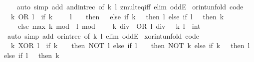 \begin{isabellebody}
%
\isadelimproof
\ \ %
\endisadelimproof
%
\isatagproof
{}\isamarkupfalse%
\ {\isacharparenleft}{\kern0pt}auto\ simp\ add{\isacharcolon}{\kern0pt}\ and{\isacharunderscore}{\kern0pt}int{\isacharunderscore}{\kern0pt}rec\ {\isacharbrackleft}{\kern0pt}of\ k\ l{\isacharbrackright}{\kern0pt}\ zmult{\isacharunderscore}{\kern0pt}eq{\isacharunderscore}{\kern0pt}{}{\isacharunderscore}{\kern0pt}iff\ elim{\isacharcolon}{\kern0pt}\ oddE{\isacharparenright}{\kern0pt}%
\endisatagproof
{\isafoldproof}%
%
\isadelimproof
\isanewline
%
\endisadelimproof
\isanewline
{}\isamarkupfalse%
\ or{\isacharunderscore}{\kern0pt}int{\isacharunderscore}{\kern0pt}unfold\ {\isacharbrackleft}{\kern0pt}code{\isacharbrackright}{\kern0pt}{\isacharcolon}{\kern0pt}\isanewline
\ \ {\isacartoucheopen}k\ OR\ l\ {\isacharequal}{\kern0pt}\ {\isacharparenleft}{\kern0pt}if\ k\ {\isacharequal}{\kern0pt}\ {\isacharminus}{\kern0pt}\ {}\ {\isasymor}\ l\ {\isacharequal}{\kern0pt}\ {\isacharminus}{\kern0pt}\ {}\ then\ {\isacharminus}{\kern0pt}\ {}\ else\ if\ k\ {\isacharequal}{\kern0pt}\ {}\ then\ l\ else\ if\ l\ {\isacharequal}{\kern0pt}\ {}\ then\ k\isanewline
\ \ \ \ else\ max\ {\isacharparenleft}{\kern0pt}k\ mod\ {}{\isacharparenright}{\kern0pt}\ {\isacharparenleft}{\kern0pt}l\ mod\ {}{\isacharparenright}{\kern0pt}\ {\isacharplus}{\kern0pt}\ {}\ {\isacharasterisk}{\kern0pt}\ {\isacharparenleft}{\kern0pt}{\isacharparenleft}{\kern0pt}k\ div\ {}{\isacharparenright}{\kern0pt}\ OR\ {\isacharparenleft}{\kern0pt}l\ div\ {}{\isacharparenright}{\kern0pt}{\isacharparenright}{\kern0pt}{\isacharparenright}{\kern0pt}{\isacartoucheclose}\ \ k\ l\ {\isacharcolon}{\kern0pt}{\isacharcolon}{\kern0pt}\ int\isanewline
%
\isadelimproof
\ \ %
\endisadelimproof
%
\isatagproof
{}\isamarkupfalse%
\ {\isacharparenleft}{\kern0pt}auto\ simp\ add{\isacharcolon}{\kern0pt}\ or{\isacharunderscore}{\kern0pt}int{\isacharunderscore}{\kern0pt}rec\ {\isacharbrackleft}{\kern0pt}of\ k\ l{\isacharbrackright}{\kern0pt}\ elim{\isacharcolon}{\kern0pt}\ oddE{\isacharparenright}{\kern0pt}%
\endisatagproof
{\isafoldproof}%
%
\isadelimproof
\isanewline
%
\endisadelimproof
\isanewline
{}\isamarkupfalse%
\ xor{\isacharunderscore}{\kern0pt}int{\isacharunderscore}{\kern0pt}unfold\ {\isacharbrackleft}{\kern0pt}code{\isacharbrackright}{\kern0pt}{\isacharcolon}{\kern0pt}\isanewline
\ \ {\isacartoucheopen}k\ XOR\ l\ {\isacharequal}{\kern0pt}\ {\isacharparenleft}{\kern0pt}if\ k\ {\isacharequal}{\kern0pt}\ {\isacharminus}{\kern0pt}\ {}\ then\ NOT\ l\ else\ if\ l\ {\isacharequal}{\kern0pt}\ {\isacharminus}{\kern0pt}\ {}\ then\ NOT\ k\ else\ if\ k\ {\isacharequal}{\kern0pt}\ {}\ then\ l\ else\ if\ l\ {\isacharequal}{\kern0pt}\ {}\ then\ k\isanewline

\end{isabellebody}
